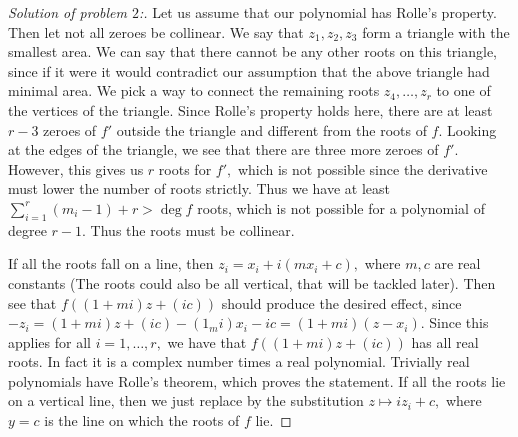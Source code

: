 \documentclass[letterpaper,11pt,twoside]{article}
\theoremstyle{proposition}
\theoremstyle{definition}
\theoremstyle{theorem}
\theoremstyle{definition}
\theoremstyle{definition}
\theoremstyle{definition}
\theoremstyle{lemma}
\theoremstyle{definition}
\theoremstyle{definition}
\theoremstyle{corollary}
\theoremstyle{definition}
\theoremstyle{definition}
\theoremstyle{definition}
\begin{document}
	\begin{proof}[Solution of problem $2$:]
	Let us assume that our polynomial has Rolle's property. Then let not all zeroes be collinear. We say that $z_1,z_2,z_3 $ form a triangle with the 
	smallest area. We can say that there cannot be any other roots on this triangle, since if it were it would contradict our assumption that the above 
	triangle had minimal area. We pick a way to connect the remaining roots $z_4, \dots, z_r$ to one of the vertices of the triangle. Since Rolle's property 
	holds here, there are at least $r-3$ zeroes of $f'$ outside the triangle and different from the roots of $f.$ Looking at the edges of the triangle, we 
	see that there are three more zeroes of $f'.$ However, this gives us $r$ roots for $f',$ which is not possible since the derivative must lower the 
	number of roots strictly. Thus we have at least $\sum_{i=1}^r (m_i-1)+r > \deg f$ roots, which is not possible for a polynomial of degree $r-1.$ Thus 
	the roots must be collinear.
	
	If all the roots fall on a line, then $z_i= x_i + i (mx_i + c),$ where $m,c$ are real constants (The roots could also be all vertical, that will be 
	tackled later). Then see that $f((1+mi)z + (ic))$ should produce the desired effect, since $-z_i= (1+mi)z + (ic) - (1_mi)x_i - ic = (1+mi)(z-x_i).$ 
	Since this applies for all $i= 1,\dots, r,$ we have that $f((1+mi)z + (ic))$ has all real roots. In fact it is a complex number times a real polynomial. 
	Trivially real polynomials have Rolle's theorem, which proves the statement. If all the roots lie on a vertical line, then we just replace by the 
	substitution $z \mapsto iz_i + c,$ where $y=c$ is the line on which the roots of $f$ lie. 
	\end{proof}
\end{document}
